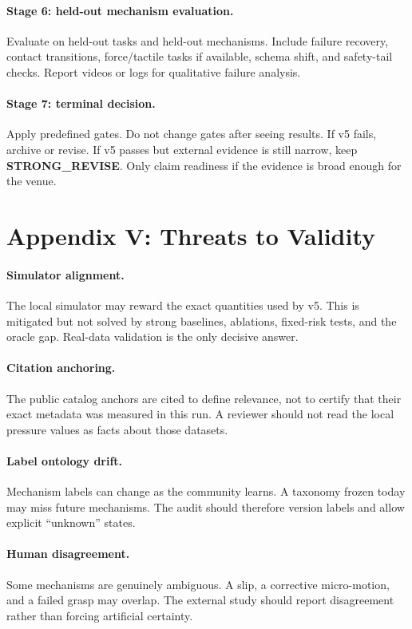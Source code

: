 \documentclass{article}
\begin{document}
\paragraph{Stage 6: held-out mechanism evaluation.}
Evaluate on held-out tasks and held-out mechanisms. Include failure recovery, contact transitions, force/tactile tasks if available, schema shift, and safety-tail checks. Report videos or logs for qualitative failure analysis.

\paragraph{Stage 7: terminal decision.}
Apply predefined gates. Do not change gates after seeing results. If v5 fails, archive or revise. If v5 passes but external evidence is still narrow, keep \textbf{STRONG\_REVISE}. Only claim readiness if the evidence is broad enough for the venue.

\section{Appendix V: Threats to Validity}
\paragraph{Simulator alignment.}
The local simulator may reward the exact quantities used by v5. This is mitigated but not solved by strong baselines, ablations, fixed-risk tests, and the oracle gap. Real-data validation is the only decisive answer.

\paragraph{Citation anchoring.}
The public catalog anchors are cited to define relevance, not to certify that their exact metadata was measured in this run. A reviewer should not read the local pressure values as facts about those datasets.

\paragraph{Label ontology drift.}
Mechanism labels can change as the community learns. A taxonomy frozen today may miss future mechanisms. The audit should therefore version labels and allow explicit ``unknown'' states.

\paragraph{Human disagreement.}
Some mechanisms are genuinely ambiguous. A slip, a corrective micro-motion, and a failed grasp may overlap. The external study should report disagreement rather than forcing artificial certainty.
\end{document}
